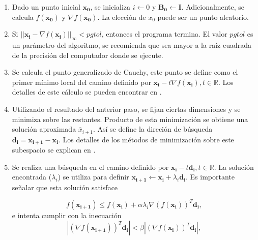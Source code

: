 \begin{enumerate}

\item Dado un punto inicial $\boldsymbol{x_0}$, se inicializa $i \gets 0$ y 
  $\boldsymbol{B_0} \gets \boldsymbol{\mathbf{I}}$. Adicionalmente, se calcula
    $f(\boldsymbol{x_0})$ y $\nabla f(\boldsymbol{x_0})$. La elección de $x_0$ puede ser un punto aleatorio.

\item Si $||\boldsymbol{x_i} - \nabla f({\boldsymbol{x_i}})||_{\infty} < pgtol$, entonces el programa termina.
  El valor $pgtol$ es un parámetro del algoritmo, se recomienda que sea mayor a la raíz cuadrada de la
    precisión del computador donde se ejecute.

\item Se calcula el punto generalizado de Cauchy, este punto se define como el primer mínimo local 
  del camino definido por $\boldsymbol{x_i} - t \nabla f(\boldsymbol{x_i}), t \in \mathbb{R}$. 
    Los detalles de este cálculo se pueden encontrar en \cite{Byrd1995}.

\item Utilizando el resultado del anterior paso, se fijan ciertas dimensiones y se minimiza sobre las
  restantes. Producto de esta minimización se obtiene una solución aproximada $\overline{x}_{i+1}$.
    Así se define la direción de búsqueda $\boldsymbol{d_i} = \boldsymbol{\overline{x}_{i+1}} - \boldsymbol{x_i}$.
  Los detalles de los métodos de minimización sobre este subespacio se explican en \cite{Byrd1995}.

\item Se realiza una búsqueda en el camino definido por $\boldsymbol{x_i} - t \boldsymbol{d_i}, t \in \mathbb{R}$.
      La solución encontrada ($\lambda_i$) se utiliza para definir 
      $\boldsymbol{x_{i+1}} \gets \boldsymbol{x_{i}} + \lambda_i \boldsymbol{d_i}$.
      Es importante señalar que esta solución satisface

      \begin{equation}
      f(\boldsymbol{x_{i+1}}) \leq f(\boldsymbol{x_{i}}) + \alpha \lambda_i \nabla (f(\boldsymbol{x_{i}}))^T
        \boldsymbol{d_i},
      \end{equation}
      e intenta cumplir con la inecuación
      \begin{equation}
        |(\nabla f(\boldsymbol{x_{i+1}}))^T \boldsymbol{d_i}| < \beta |(\nabla f(\boldsymbol{x_{i}}))^T
        \boldsymbol{d_i}|,
      \end{equation}


\end{enumerate}
